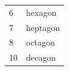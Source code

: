 \begin{table}[H]
{\begin{tabular}[t]{|l|l|}
        6 &
    
    
        hexagon%
     \tabularnewline\cline{1-1}\cline{2-2}
    
    
        7 &
    
    
        heptagon%
     \tabularnewline\cline{1-1}\cline{2-2}
    
    
        8 &
    
    
        octagon%
     \tabularnewline\cline{1-1}\cline{2-2}
    
    
        10 &
    
    
        decagon%
     \tabularnewline\cline{1-1}\cline{2-2}
    

\end{tabular}}
\end{table}
